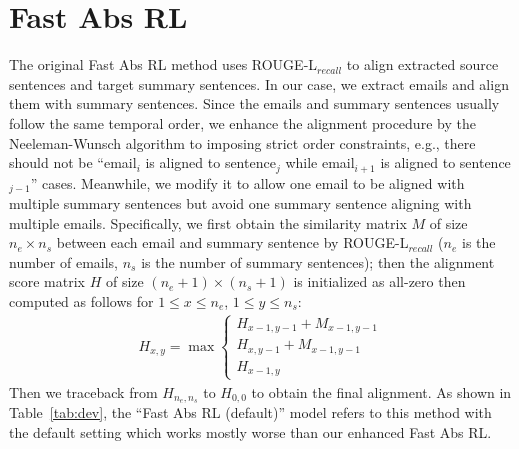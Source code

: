 \section{Fast Abs RL}
\label{appedix:fastabs}
The original Fast Abs RL method \cite{chen2018fast} uses ROUGE-L$_{recall}$ to align extracted source sentences and target summary sentences. In our case, we extract emails and align them with summary sentences. Since the emails and summary sentences usually follow the same temporal order, we enhance the alignment procedure by the Neeleman-Wunsch algorithm \cite{needleman1970general, rameshkumar2020storytelling} to imposing strict order constraints, e.g., there should not be ``email$_i$ is aligned to sentence$_j$ while email$_{i+1}$ is aligned to sentence$_{j-1}$'' cases. Meanwhile, we modify it to allow one email to be aligned with multiple summary sentences but avoid one summary sentence aligning with multiple emails. Specifically, we first obtain the similarity matrix $M$ of size $n_e \times n_s$ between each email and summary sentence by ROUGE-L$_{recall}$ ($n_e$ is the number of emails, $n_s$ is the number of summary sentences); then the alignment score matrix $H$ of size $(n_e + 1) \times (n_s + 1)$ is initialized as all-zero then computed as follows for $1 \leq x \leq n_e$, $1 \leq y \leq n_s$:
\begin{align*}
    H_{x,y} = \max \left\{
                \begin{array}{ll}
                  H_{x-1, y-1} + M_{x-1, y-1}\\
                  H_{x, y-1} + M_{x-1, y-1}\\
                  H_{x-1, y}
                \end{array}
              \right.
\end{align*}
Then we traceback from $H_{n_e,n_s}$ to $H_{0,0}$ to obtain the final alignment. As shown in Table~\ref{tab:dev}, the ``Fast Abs RL (default)'' model refers to this method with the default setting which works mostly worse than our enhanced Fast Abs RL. 

